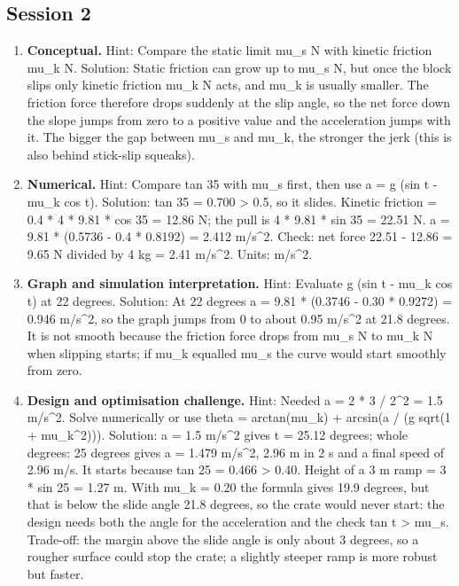 \documentclass[11pt,a4paper]{article}
\begin{document}
\subsection*{Session 2}
\begin{enumerate}[nosep]
\item \textbf{Conceptual.} Hint: Compare the static limit mu\_s N with kinetic friction mu\_k N. Solution: Static friction can grow up to mu\_s N, but once the block slips only kinetic friction mu\_k N acts, and mu\_k is usually smaller. The friction force therefore drops suddenly at the slip angle, so the net force down the slope jumps from zero to a positive value and the acceleration jumps with it. The bigger the gap between mu\_s and mu\_k, the stronger the jerk (this is also behind stick-slip squeaks).
\item \textbf{Numerical.} Hint: Compare tan 35 with mu\_s first, then use a = g (sin t - mu\_k cos t). Solution: tan 35 = 0.700 \textgreater{} 0.5, so it slides. Kinetic friction = 0.4 * 4 * 9.81 * cos 35 = 12.86 N; the pull is 4 * 9.81 * sin 35 = 22.51 N. a = 9.81 * (0.5736 - 0.4 * 0.8192) = 2.412 m/s\textasciicircum{}2. Check: net force 22.51 - 12.86 = 9.65 N divided by 4 kg = 2.41 m/s\textasciicircum{}2. Units: m/s\textasciicircum{}2.
\item \textbf{Graph and simulation interpretation.} Hint: Evaluate g (sin t - mu\_k cos t) at 22 degrees. Solution: At 22 degrees a = 9.81 * (0.3746 - 0.30 * 0.9272) = 0.946 m/s\textasciicircum{}2, so the graph jumps from 0 to about 0.95 m/s\textasciicircum{}2 at 21.8 degrees. It is not smooth because the friction force drops from mu\_s N to mu\_k N when slipping starts; if mu\_k equalled mu\_s the curve would start smoothly from zero.
\item \textbf{Design and optimisation challenge.} Hint: Needed a = 2 * 3 / 2\textasciicircum{}2 = 1.5 m/s\textasciicircum{}2. Solve numerically or use theta = arctan(mu\_k) + arcsin(a / (g sqrt(1 + mu\_k\textasciicircum{}2))). Solution: a = 1.5 m/s\textasciicircum{}2 gives t = 25.12 degrees; whole degrees: 25 degrees gives a = 1.479 m/s\textasciicircum{}2, 2.96 m in 2 s and a final speed of 2.96 m/s. It starts because tan 25 = 0.466 \textgreater{} 0.40. Height of a 3 m ramp = 3 * sin 25 = 1.27 m. With mu\_k = 0.20 the formula gives 19.9 degrees, but that is below the slide angle 21.8 degrees, so the crate would never start: the design needs both the angle for the acceleration and the check tan t \textgreater{} mu\_s. Trade-off: the margin above the slide angle is only about 3 degrees, so a rougher surface could stop the crate; a slightly steeper ramp is more robust but faster.
\end{enumerate}
\end{document}
